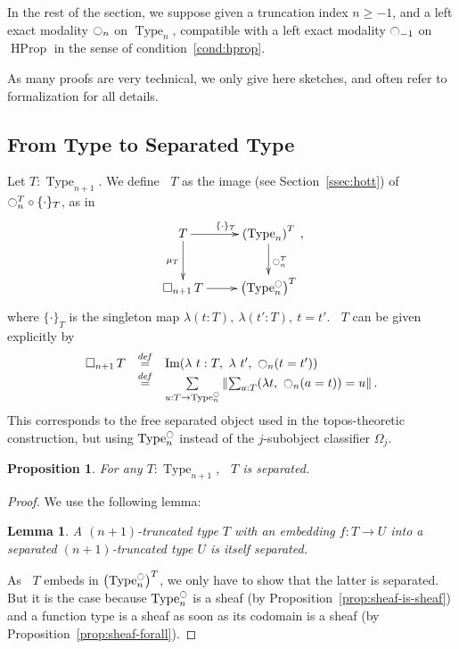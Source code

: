 \documentclass[preprint,9pt,numbers]{sigplanconf}
\newtheorem{prop}[thm]{Proposition}
\newtheorem{lem}[thm]{Lemma}
\newcommand \defeq {\overset{de\hspace{-0.2ex}f}{=}}
\DeclareMathOperator{\Type}{Type}
\DeclareMathOperator{\HProp}{HProp}
\DeclareMathOperator{\im}{Im}
\newcommand{\modal}{\ensuremath{\ocircle}}
\newcommand \separated {\mathop{\square_{n+1}} }
\newenvironment{mymath}[1][-0em]{%
  \newcommand\mymathaux{\vspace{#1}}%
  \vspace{#1}%
  \begin{equation*}%
  }{ %
    \mymathaux%
  \end{equation*}}
\begin{document}

In the rest of the section, we suppose given a truncation index
$n\geqslant -1$, and a left exact modality $\modal_n$ on $\Type_n$,
compatible with a left exact modality $\modal_{-1}$ on $\HProp$ in the
sense of condition~\ref{cond:hprop}.

As many proofs are very technical, we only give here sketches, and
often refer to formalization for all details.

\subsection{From Type to Separated Type}
\label{ssec:from-type-separated}

Let $T : \Type_{n+1}$. We define $\separated T$ as the image (see
Section~\ref{ssec:hott}) of
$\modal_n^T \circ \{\cdot\}_T$, as in
\begin{mymath}\xymatrix{
    T \ar[r]^{\{\cdot\}_T} \ar[d]_{\mu_T} & \left(\Type_n\right)^T \ar[d]^{\modal_n^T} \\
  \separated T \ar[r]& \left( \Type_n^\modal \right)^T
}, \end{mymath}%
where $\{\cdot\}_T$ is the singleton map $\lambda (t:T),~\lambda
(t':T),~t=t'$. 
%
$\separated T$ can be given explicitly by
%
\begin{mymath}
\begin{array}{rcl}
\separated T &\defeq & \im (\lambda~t:T,~\lambda~ t',~ \modal_n (t = t')) \\
          & \defeq & \sum\limits_{u:T \to \Type_n^\modal} \left\| \sum_{a:T} 
            (\lambda t,~\modal_n (a=t)) = u\right\|.
\end{array}
\end{mymath}%
%
This corresponds to the free separated object used in the topos-theoretic construction, but using $\Type_n^\modal$ instead of the
$j$-subobject classifier $\Omega_j$.
%
\begin{prop}
  For any $T\!:\!\Type_{n+1}$, $\separated T$ is separated.  
\end{prop}

\begin{proof}
We use the following lemma:
\begin{lem}
  A $(n+1)$-truncated type $T$ with an embedding $f : T \to U$
  into a separated $(n+1)$-truncated type $U$ is itself separated.
\end{lem}
As $\separated T$ embeds in $\left( \Type_n^\modal \right)^T$, we only
have to show that the latter is separated. But it is the case because
$\Type_n^\modal$ is a sheaf (by Proposition~\ref{prop:sheaf-is-sheaf})
and a function type is a sheaf as soon
as its codomain is a sheaf (by Proposition~\ref{prop:sheaf-forall}).
\end{proof}
\end{document}
